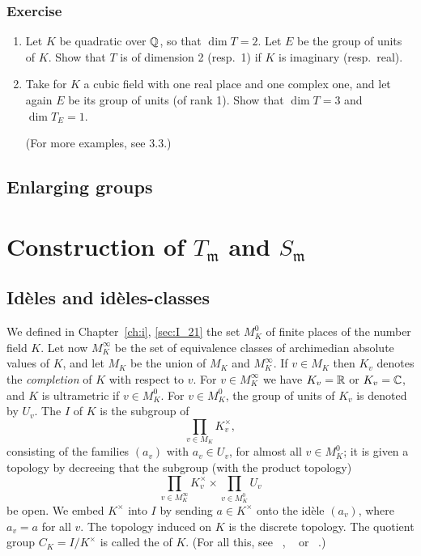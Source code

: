 \subsubsection*{Exercise}
\begin{enumerate}[label=\textit{\alph*}.]
\item Let $K$ be quadratic over $\mathbb{Q}$, so that $\dim T = 2$. Let $E$ be the
	group of units of $K$. Show that $T$ is of dimension 2 (resp.\ 1) if
	$K$ is imaginary (resp.\ real).
\item Take for $K$ a cubic field with one real place and one complex one, and
	let again $E$ be its group of units (of rank 1). Show that $\dim T = 3$
	and $\dim T_E = 1$.

	(For more examples, see 3.3.)\dpage
\end{enumerate}

\subsection{Enlarging groups}
\label{sec:II_13}

\section{Construction of \texorpdfstring{$T_{\mathfrak{m}}$}{Tm} and
\texorpdfstring{$S_{\mathfrak{m}}$}{Sm}}

\subsection{Idèles and idèles-classes}
\label{sec:II_21}
We defined in Chapter~\ref{ch:i}, \ref{sec:I_21} the set $M_K^0$ of finite
places of the number field $K$. Let now $M_K^\infty$
be the set of equivalence classes of archimedian absolute values of $K$, and
let $M_K$ be the union of $M_K$ and $M_K^\infty$. If $v \in
M_K$ then $K_v$ denotes the \emph{completion} of $K$ with respect to $v$. For
$v \in M_K^\infty$ we have $K_v = \mathbb{R}$ or $K_v = \mathbb{C}$, and $K$ is ultrametric if
$v \in M_K^0$. For $v \in M_K^0$, the group of units of $K_v$ is denoted by
$U_v$. The  $I$
of $K$ is the subgroup of
\[
	\prod_{v \in M_K} K_v^\times,
\]
consisting of the families $(a_v)$ with $a_v \in U_v$, for almost all $v \in
M_K^0$; it is given a topology by decreeing that the subgroup (with the product
topology)
\[
	\prod_{v \in M_K^\infty} K_v^\times \times \prod_{v \in M_K^0} U_v
\]
be open. We embed $K^\times$ into $I$ by sending $a \in K^\times$ onto the
idèle $(a_v)$, where $a_v = a$ for all $v$. The topology induced on $K$ is the
discrete topology. The quotient group $C_K = I/K^\times$ is called the  of
$K$.
(For all this, see \citeauthor{6}~\cite{6}, \citeauthor{13}~\cite{13} or
\citeauthor{44}~\cite{44}.)


